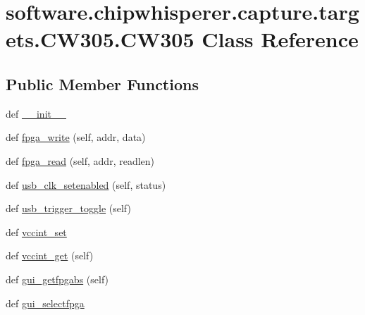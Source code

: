 \hypertarget{classsoftware_1_1chipwhisperer_1_1capture_1_1targets_1_1CW305_1_1CW305}{}\section{software.\+chipwhisperer.\+capture.\+targets.\+C\+W305.\+C\+W305 Class Reference}
\label{classsoftware_1_1chipwhisperer_1_1capture_1_1targets_1_1CW305_1_1CW305}
\subsection*{Public Member Functions}
\begin{DoxyCompactItemize}
\item 
def \hyperlink{classsoftware_1_1chipwhisperer_1_1capture_1_1targets_1_1CW305_1_1CW305_aefa15bacc896a499d90b732671fae282}{\+\_\+\+\_\+init\+\_\+\+\_\+}
\item 
def \hyperlink{classsoftware_1_1chipwhisperer_1_1capture_1_1targets_1_1CW305_1_1CW305_ae03b33dbb86ffd11d1e2a245cd1575d4}{fpga\+\_\+write} (self, addr, data)
\item 
def \hyperlink{classsoftware_1_1chipwhisperer_1_1capture_1_1targets_1_1CW305_1_1CW305_af9987c39ac92c606f57a7f855bec6370}{fpga\+\_\+read} (self, addr, readlen)
\item 
def \hyperlink{classsoftware_1_1chipwhisperer_1_1capture_1_1targets_1_1CW305_1_1CW305_a4430307e95ad706bbe0d1cb9893f9a77}{usb\+\_\+clk\+\_\+setenabled} (self, status)
\item 
def \hyperlink{classsoftware_1_1chipwhisperer_1_1capture_1_1targets_1_1CW305_1_1CW305_a44563e0a37e1077fb97f00204b6c8750}{usb\+\_\+trigger\+\_\+toggle} (self)
\item 
def \hyperlink{classsoftware_1_1chipwhisperer_1_1capture_1_1targets_1_1CW305_1_1CW305_a91cf1ba127bc4dff797dc4be22a93e19}{vccint\+\_\+set}
\item 
def \hyperlink{classsoftware_1_1chipwhisperer_1_1capture_1_1targets_1_1CW305_1_1CW305_aca44ef3c67b1eda9def6d02be986fbf5}{vccint\+\_\+get} (self)
\item 
def \hyperlink{classsoftware_1_1chipwhisperer_1_1capture_1_1targets_1_1CW305_1_1CW305_a6f1ebd6fd72129618fe1c0ddd1682c06}{gui\+\_\+getfpgabs} (self)
\item 
def \hyperlink{classsoftware_1_1chipwhisperer_1_1capture_1_1targets_1_1CW305_1_1CW305_a2a8323849b28b7bd9fb5b637de980507}{gui\+\_\+selectfpga}

\end{DoxyCompactItemize}

